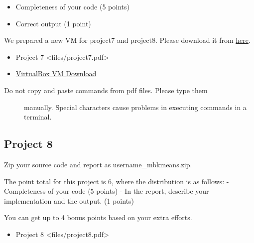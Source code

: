 \begin{itemize}

\item
  Completeness of your code (5 points)
\item
  Correct output (1 point)
\end{itemize}

We prepared a new VM for project7 and project8. Please download it from
\href{https://drive.google.com/file/d/0B2iFsq4CY1DteHhJUEk5cDNJajQ/view}{here}.

\begin{itemize}

\item
  Project 7 \textless{}files/project7.pdf\textgreater{}
\item
  \href{https://drive.google.com/file/d/0B2iFsq4CY1DteHhJUEk5cDNJajQ/view}{VirtualBox
  VM Download}
\end{itemize}

\begin{description}
\item[Do not copy and paste commands from pdf files. Please type them]
manually. Special characters cause problems in executing commands in a
terminal.
\end{description}

\subsection{Project 8}\label{project-8}

Zip your source code and report as username\_mbkmeans.zip.

The point total for this project is 6, where the distribution is as
follows: - Completeness of your code (5 points) - In the report,
describe your implementation and the output. (1 points)

You can get up to 4 bonus points based on your extra efforts.

\begin{itemize}

\item
  Project 8 \textless{}files/project8.pdf\textgreater{}
\end{itemize}
